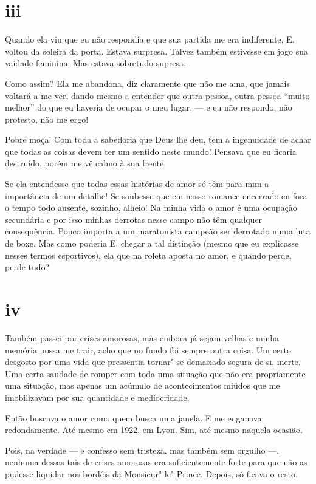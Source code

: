 \section{iii}



Quando ela viu que eu não respondia e que sua partida me era
indiferente, E. voltou da soleira da porta. Estava surpresa. Talvez
também estivesse em jogo sua vaidade feminina. Mas
estava sobretudo supresa.

Como assim? Ela me abandona, diz claramente que não me ama, que jamais
voltará a me ver, dando mesmo a entender que outra pessoa, outra pessoa
``muito melhor'' do que eu haveria de ocupar o meu lugar, --- e eu não
respondo, não protesto, não me ergo!

Pobre moça! Com toda a sabedoria que Deus lhe deu, tem a
ingenuidade de achar que todas as coisas devem ter um sentido
neste mundo! Pensava que eu ficaria destruído, porém me vê calmo à sua
frente.

Se ela entendesse que todas essas histórias de amor só têm para mim a
importância de um detalhe! Se soubesse que em nosso romance
encerrado eu fora o tempo todo ausente, sozinho, alheio! Na minha vida
o amor é uma ocupação secundária e por isso minhas derrotas nesse
campo não têm qualquer consequência. Pouco importa a um maratonista
campeão ser derrotado numa luta de boxe. Mas como poderia E. chegar a
tal distinção (mesmo que eu explicasse nesses termos esportivos), ela
que na roleta aposta no amor, e quando perde, perde tudo?

\section{iv}

Também passei por crises amorosas, mas embora já sejam velhas e minha
memória possa me trair, acho que no fundo foi sempre outra coisa. Um
certo desgosto por uma vida que pressentia tornar"-se demasiado segura
de si, inerte. Uma certa saudade de romper com toda uma
situação que não era propriamente uma situação, mas apenas um acúmulo
de acontecimentos miúdos que me imobilizavam por sua quantidade e
mediocridade.

Então buscava o amor como quem busca uma janela. E me enganava
redondamente. Até mesmo em 1922, em Lyon. Sim, até mesmo naquela
ocasião.

Pois, na verdade --- e confesso sem tristeza, mas também sem orgulho ---,
nenhuma dessas tais de crises amorosas era suficientemente forte
para que não as pudesse liquidar nos bordéis da Monsieur"-le"-Prince.
Depois, só ficava o resto.

